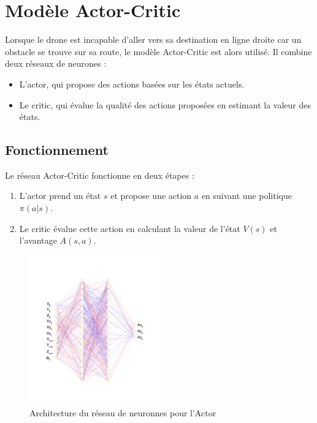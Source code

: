 \documentclass[a4paper, 12pt]{article}
\begin{document}
\section{Modèle Actor-Critic}
Lorsque le drone est incapable d'aller vers sa destination en ligne droite car un obstacle se trouve sur sa route, le modèle Actor-Critic est alors utilisé. Il combine deux réseaux de neurones :
\begin{itemize}
    \item L'actor, qui propose des actions basées sur les états actuels.
    \item Le critic, qui évalue la qualité des actions proposées en estimant la valeur des états.
\end{itemize}

\subsection{Fonctionnement}
Le réseau Actor-Critic fonctionne en deux étapes :
\begin{enumerate}
    \item L'actor prend un état $s$ et propose une action $a$ en suivant une politique $\pi(a|s)$.
    \item Le critic évalue cette action en calculant la valeur de l'état $V(s)$ et l'avantage $A(s, a)$.
\end{enumerate}
\begin{figure}[h]
    \centering
    \includegraphics[width=0.5\textwidth]{actor_cnn.png}
    \caption{Architecture du réseau de neuronnes pour l'Actor}
    \label{fig:actor-critic}
\end{figure}
\end{document}
